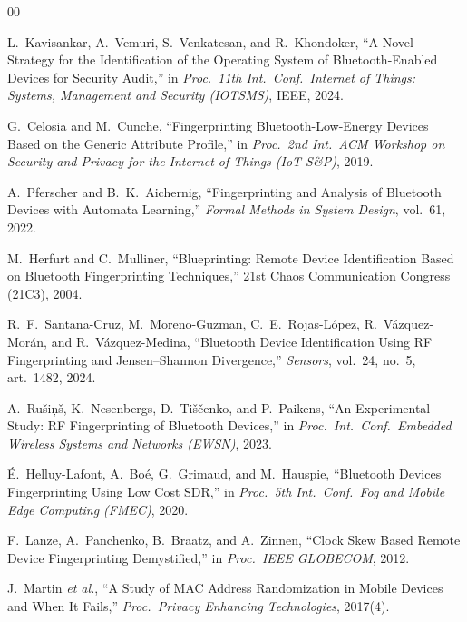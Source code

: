 \documentclass[conference]{IEEEtran}
\begin{document}
\begin{thebibliography}{00}

L.~Kavisankar, A.~Vemuri, S.~Venkatesan, and R.~Khondoker,
``A Novel Strategy for the Identification of the Operating System of
Bluetooth-Enabled Devices for Security Audit,''
in \emph{Proc.\ 11th Int.\ Conf.\ Internet of Things: Systems,
Management and Security (IOTSMS)}, IEEE, 2024.

G.~Celosia and M.~Cunche,
``Fingerprinting Bluetooth-Low-Energy Devices Based on the Generic
Attribute Profile,''
in \emph{Proc.\ 2nd Int.\ ACM Workshop on Security and Privacy for the
Internet-of-Things (IoT S\&P)}, 2019.

A.~Pferscher and B.~K.~Aichernig,
``Fingerprinting and Analysis of Bluetooth Devices with Automata
Learning,''
\emph{Formal Methods in System Design}, vol.~61, 2022.

M.~Herfurt and C.~Mulliner,
``Blueprinting: Remote Device Identification Based on Bluetooth
Fingerprinting Techniques,''
21st Chaos Communication Congress (21C3), 2004.

R.~F.~Santana-Cruz, M.~Moreno-Guzman, C.~E.~Rojas-L\'opez,
R.~V\'azquez-Mor\'an, and R.~V\'azquez-Medina,
``Bluetooth Device Identification Using RF Fingerprinting and
Jensen--Shannon Divergence,''
\emph{Sensors}, vol.~24, no.~5, art.~1482, 2024.

A.~Ru\v{s}i\c{n}\v{s}, K.~Nesenbergs, D.~Ti\v{s}\v{c}enko, and P.~Paikens,
``An Experimental Study: RF Fingerprinting of Bluetooth Devices,''
in \emph{Proc.\ Int.\ Conf.\ Embedded Wireless Systems and Networks
(EWSN)}, 2023.

\'E.~Helluy-Lafont, A.~Bo\'e, G.~Grimaud, and M.~Hauspie,
``Bluetooth Devices Fingerprinting Using Low Cost SDR,''
in \emph{Proc.\ 5th Int.\ Conf.\ Fog and Mobile Edge Computing (FMEC)},
2020.

F.~Lanze, A.~Panchenko, B.~Braatz, and A.~Zinnen,
``Clock Skew Based Remote Device Fingerprinting Demystified,''
in \emph{Proc.\ IEEE GLOBECOM}, 2012.

J.~Martin \emph{et al.},
``A Study of MAC Address Randomization in Mobile Devices and When It
Fails,''
\emph{Proc.\ Privacy Enhancing Technologies}, 2017(4).


\end{thebibliography}
\end{document}

